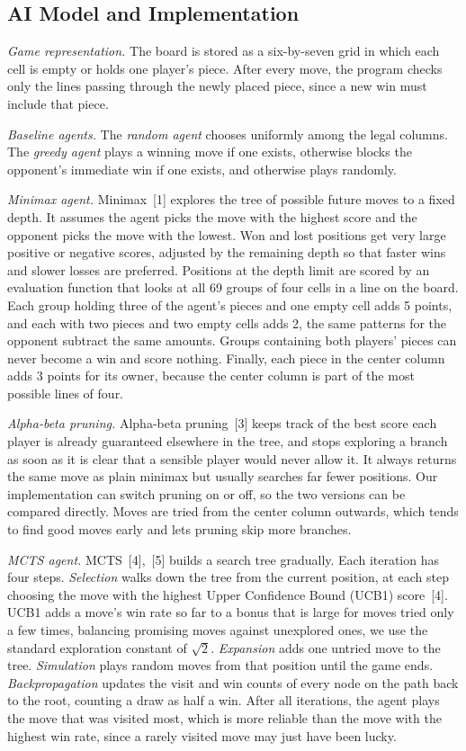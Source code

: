 \documentclass[10pt,twocolumn,letterpaper]{article}
\begin{document}
\subsection{AI Model and Implementation}

\textit{Game representation.} The board is stored as a six-by-seven grid in which each cell
is empty or holds one player's piece. After every move, the program checks only the lines
passing through the newly placed piece, since a new win must include that piece.

\textit{Baseline agents.} The \emph{random agent} chooses uniformly among the legal
columns. The \emph{greedy agent} plays a winning move if one exists, otherwise blocks the
opponent's immediate win if one exists, and otherwise plays randomly.

\textit{Minimax agent.} Minimax~[1] explores the tree of possible future moves to a fixed
depth. It assumes the agent picks the move with the highest score and the opponent picks the
move with the lowest. Won and lost positions get very large positive or negative scores,
adjusted by the remaining depth so that faster wins and slower losses are preferred.
Positions at the depth limit are scored by an evaluation function that looks at all 69
groups of four cells in a line on the board. Each group holding three of the agent's pieces
and one empty cell adds 5 points, and each with two pieces and two empty cells adds 2,
the same patterns for the opponent subtract the same amounts. Groups containing both
players' pieces can never become a win and score nothing. Finally, each piece in the center
column adds 3 points for its owner, because the center column is part of the most possible
lines of four.

\textit{Alpha-beta pruning.} Alpha-beta pruning~[3] keeps track of the best score each
player is already guaranteed elsewhere in the tree, and stops exploring a branch as soon as
it is clear that a sensible player would never allow it. It always returns the same move as
plain minimax but usually searches far fewer positions. Our implementation can switch
pruning on or off, so the two versions can be compared directly. Moves are tried from the
center column outwards, which tends to find good moves early and lets pruning skip more
branches.

\textit{MCTS agent.} MCTS~[4],~[5] builds a search tree gradually. Each iteration has four
steps. \emph{Selection} walks down the tree from the current position, at each step choosing
the move with the highest Upper Confidence Bound (UCB1) score~[4]. UCB1 adds a move's
win rate so far to a bonus that is large for moves tried only a few times, balancing
promising moves against unexplored ones, we use the standard exploration constant of
$\sqrt{2}$. \emph{Expansion} adds one untried move to the tree. \emph{Simulation} plays
random moves from that position until the game ends. \emph{Backpropagation} updates the
visit and win counts of every node on the path back to the root, counting a draw as half a
win. After all iterations, the agent plays the move that was visited most, which is more
reliable than the move with the highest win rate, since a rarely visited move may just have
been lucky.
\end{document}
